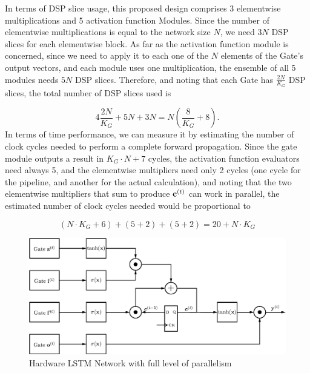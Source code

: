 In terms of DSP slice usage, this proposed design comprises 3 elementwise multiplications and 5 activation function Modules. Since the number of elementwise multiplications is
equal to the network size $N$, we need $3N$ DSP slices for each elementwise block. As far as the activation function module is concerned, since we need to apply it to each one
of the $N$ elements of the Gate's output vectors, and each module uses one multiplication, the ensemble of all 5 modules needs $5N$ DSP slices. Therefore, and noting that each
Gate has $\frac{2N}{K_G}$ DSP slices, the total number of DSP slices used is

\begin{equation}\label{eq:numdsp_network}
    4\frac{2N}{K_G} + 5N + 3N = N \left( \frac{8}{K_G} + 8 \right).
\end{equation}
In terms of time performance, we can measure it by estimating the number of clock cycles needed to perform a complete forward propagation. Since the gate module
outputs a result in $K_G \cdot N + 7$ cycles, the activation function evaluators need always 5, and the elementwise multipliers need only 2 cycles (one cycle
for the pipeline, and another for the actual calculation), and noting that the two elementwise multipliers that sum to produce $\mathbf{c}^{(t)}$ can work in parallel,
the estimated number of clock cycles needed would be proportional to

\begin{equation}\label{eq:numcc_network}
    (N \cdot K_G + 6) + (5 + 2) + (5 + 2) = 20 + N\cdot K_G
\end{equation}

\begin{figure}
    \centering
    \includegraphics[width=0.9\linewidth]{figures/network.eps}
    \caption[Hardware LSTM Network with full level of parallelism]{Hardware LSTM Network with full level of parallelism}
    \label{fig:network}
\end{figure}

